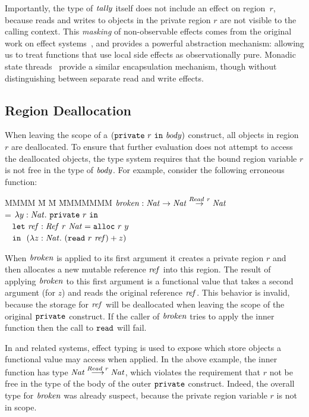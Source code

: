 Importantly, the type of $\mathit{tally}$ itself does not include an effect on region~$r$, because reads and writes to objects in the private region $r$ are not visible to the calling context. This \emph{masking} of non-observable effects comes from the original work on effect systems~\cite{Lucassen:types-and-effects}, and provides a powerful abstraction mechanism: allowing us to treat functions that use local side effects as observationally pure. Monadic state threads~\cite{Launchbudy:state-threads} provide a similar encapsulation mechanism, though without distinguishing between separate read and write effects.


\subsection{Region Deallocation}
\label{s:RegionDeallocation}
When leaving the scope of a $(\texttt{private}~ r~ \texttt{in}~ \mathit{body})$ construct, all objects in region $r$ are deallocated. To ensure that further evaluation does not attempt to access the deallocated objects, the type system requires that the bound region variable $r$ is not free in the type of $\mathit{body}$. For example, consider the following erroneous function:

\begin{tabbing}
MMMM \= M \= M \= MMMMMMM \kill
\> $\mathit{broken} : \mathit{Nat} \to \mathit{Nat} \stackrel{Read~ r}{\to} \mathit{Nat}$                \\
\> \> =    \>   $\lambda y : \mathit{Nat}.~ \texttt{private}~ r~ \texttt{in}$                           \\
\> \>      \>   ~ $\texttt{let}~ \mathit{ref} : \mathit{Ref}~ r~ \mathit{Nat} = \texttt{alloc}~ r~ y~$           \\
\> \>      \>   ~ $\texttt{in}~~ (\lambda z : \mathit{Nat}.~ (\texttt{read}~ r~ \mathit{ref}) + z)$
\end{tabbing}

When $\mathit{broken}$ is applied to its first argument it creates a private region $r$ and then allocates a new mutable reference $\mathit{ref}$ into this region. The result of applying $\mathit{broken}$ to this first argument is a functional value that takes a second argument (for $z$) and reads the original reference $\mathit{ref}$. This behavior is invalid, because the storage for $\mathit{ref}$ will be deallocated when leaving the scope of the original $\texttt{private}$ construct. If the caller of $\mathit{broken}$ tries to apply the inner function then the call to $\texttt{read}$ will fail.

In \SystemFre and related systems, effect typing is used to expose which store objects a functional value may access when applied. In the above example, the inner function has type $\mathit{Nat} \stackrel{Read~ r}{\longrightarrow} \mathit{Nat}$, which violates the requirement that $r$ not be free in the type of the body of the outer $\texttt{private}$ construct. Indeed, the overall type for $\mathit{broken}$ was already suspect, because the private region variable $r$ is not in scope. 


